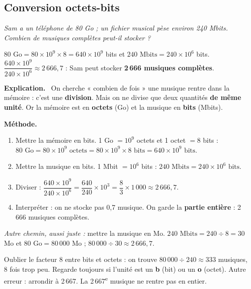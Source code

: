 \documentclass[addpoints, 11pt]{exam}
\newcommand{\enonce}[1]{\textit{#1}\par\smallskip}
\newcommand{\methode}{\par\smallskip\noindent\textbf{Méthode.}\ }
\newcommand{\explication}{\par\smallskip\noindent\textbf{Explication.}\ }
\DeclareRobustCommand{\_}{\textunderscore\allowbreak}
\begin{document}
\begin{questions}

\section{Conversion octets-bits}

\question[2] \enonce{Sam a un téléphone de 80 Go ; un fichier musical pèse environ 240 Mbits. Combien de musiques complètes peut-il stocker ?}

\begin{reponse}
$80 \text{ Go} = 80 \times 10^9 \times 8 = 640 \times 10^9$ bits et $240 \text{ Mbits} = 240 \times 10^6$ bits.\\
$\dfrac{640 \times 10^9}{240 \times 10^6} \approx 2\,666{,}7$ : Sam peut stocker \textbf{2\,666 musiques complètes}.
\end{reponse}

\explication
On cherche « combien de fois » une musique rentre dans la mémoire : c'est une \textbf{division}. Mais on ne divise que deux quantités \textbf{de même unité}. Or la mémoire est en \textbf{octets} (Go) et la musique en \textbf{bits} (Mbits).

\methode
\begin{enumerate}
  \item Mettre la mémoire en bits. 1 Go $= 10^9$ octets et 1 octet $=8$ bits :\\
  $80 \text{ Go} = 80 \times 10^9 \text{ octets} = 80 \times 10^9 \times 8 \text{ bits} = 640 \times 10^9 \text{ bits}$.
  \item Mettre la musique en bits. 1 Mbit $= 10^6$ bits : $240 \text{ Mbits} = 240 \times 10^6 \text{ bits}$.
  \item Diviser :
  $\dfrac{640 \times 10^9}{240 \times 10^6} = \dfrac{640}{240} \times 10^{3} = \dfrac{8}{3} \times 1\,000 \approx 2\,666{,}7$.
  \item Interpréter : on ne stocke pas 0,7 musique. On garde la \textbf{partie entière} : 2\,666 musiques complètes.
\end{enumerate}
\textit{Autre chemin, aussi juste :} mettre la musique en Mo. $240 \text{ Mbits} = 240 \div 8 = 30$ Mo et $80 \text{ Go} = 80\,000$ Mo ; $80\,000 \div 30 \approx 2\,666{,}7$.

\begin{erreur}
Oublier le facteur 8 entre bits et octets : on trouve $80\,000 \div 240 \approx 333$ musiques, 8 fois trop peu. Regarde toujours si l'unité est un \textbf{b} (bit) ou un \textbf{o} (octet). Autre erreur : arrondir à 2\,667. La 2\,667\textsuperscript{e} musique ne rentre pas en entier.
\end{erreur}


\end{questions}
\end{document}
